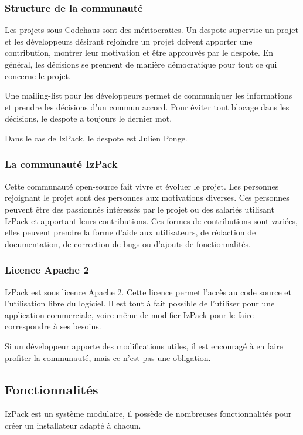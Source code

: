 \subsubsection{Structure de la communauté}
Les projets sous Codehaus sont des méritocraties.
Un despote supervise un projet et les développeurs désirant rejoindre un projet doivent apporter une contribution, montrer leur motivation et être approuvés par le despote.
En général, les décisions se prennent de manière démocratique pour tout ce qui concerne le projet.

Une mailing-list pour les développeurs permet de communiquer les informations et prendre les décisions d'un commun accord.
Pour éviter tout blocage dans les décisions, le despote a toujours le dernier mot.

Dans le cas de IzPack, le despote est Julien Ponge.

\subsubsection{La communauté IzPack}
Cette communauté open-source fait vivre et évoluer le projet.
Les personnes rejoignant le projet sont des personnes aux motivations diverses.
Ces personnes peuvent être des passionnés intéressés par le projet ou des salariés utilisant IzPack et apportant leurs contributions.
Ces formes de contributions sont variées, elles peuvent prendre la forme d'aide aux utilisateurs, de rédaction de documentation, de correction de bugs ou d'ajouts de fonctionnalités.

\subsubsection{Licence Apache 2}
IzPack est sous licence Apache 2. Cette licence permet l'accès au code source et l'utilisation libre du logiciel.
Il est tout à fait possible de l'utiliser pour une application commerciale, voire même de modifier IzPack pour le faire correspondre à ses besoins.

Si un développeur apporte des modifications utiles, il est encouragé à en faire profiter la communauté, mais ce n'est pas une obligation.

\subsection{Fonctionnalités}
IzPack est un système modulaire, il possède de nombreuses fonctionnalités pour créer un installateur adapté à chacun.

